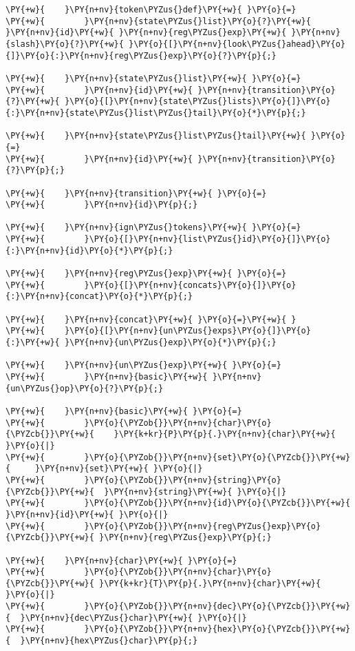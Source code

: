 \begin{Verbatim}[commandchars=\\\{\}]
\PY{+w}{    }\PY{n+nv}{token\PYZus{}def}\PY{+w}{ }\PY{o}{=}
\PY{+w}{        }\PY{n+nv}{state\PYZus{}list}\PY{o}{?}\PY{+w}{ }\PY{n+nv}{id}\PY{+w}{ }\PY{n+nv}{reg\PYZus{}exp}\PY{+w}{ }\PY{n+nv}{slash}\PY{o}{?}\PY{+w}{ }\PY{o}{[}\PY{n+nv}{look\PYZus{}ahead}\PY{o}{]}\PY{o}{:}\PY{n+nv}{reg\PYZus{}exp}\PY{o}{?}\PY{p}{;}

\PY{+w}{    }\PY{n+nv}{state\PYZus{}list}\PY{+w}{ }\PY{o}{=}
\PY{+w}{        }\PY{n+nv}{id}\PY{+w}{ }\PY{n+nv}{transition}\PY{o}{?}\PY{+w}{ }\PY{o}{[}\PY{n+nv}{state\PYZus{}lists}\PY{o}{]}\PY{o}{:}\PY{n+nv}{state\PYZus{}list\PYZus{}tail}\PY{o}{*}\PY{p}{;}

\PY{+w}{    }\PY{n+nv}{state\PYZus{}list\PYZus{}tail}\PY{+w}{ }\PY{o}{=}
\PY{+w}{        }\PY{n+nv}{id}\PY{+w}{ }\PY{n+nv}{transition}\PY{o}{?}\PY{p}{;}

\PY{+w}{    }\PY{n+nv}{transition}\PY{+w}{ }\PY{o}{=}
\PY{+w}{        }\PY{n+nv}{id}\PY{p}{;}

\PY{+w}{    }\PY{n+nv}{ign\PYZus{}tokens}\PY{+w}{ }\PY{o}{=}
\PY{+w}{        }\PY{o}{[}\PY{n+nv}{list\PYZus{}id}\PY{o}{]}\PY{o}{:}\PY{n+nv}{id}\PY{o}{*}\PY{p}{;}

\PY{+w}{    }\PY{n+nv}{reg\PYZus{}exp}\PY{+w}{ }\PY{o}{=}
\PY{+w}{        }\PY{o}{[}\PY{n+nv}{concats}\PY{o}{]}\PY{o}{:}\PY{n+nv}{concat}\PY{o}{*}\PY{p}{;}

\PY{+w}{    }\PY{n+nv}{concat}\PY{+w}{ }\PY{o}{=}\PY{+w}{ }
\PY{+w}{	}\PY{o}{[}\PY{n+nv}{un\PYZus{}exps}\PY{o}{]}\PY{o}{:}\PY{+w}{ }\PY{n+nv}{un\PYZus{}exp}\PY{o}{*}\PY{p}{;}

\PY{+w}{    }\PY{n+nv}{un\PYZus{}exp}\PY{+w}{ }\PY{o}{=}
\PY{+w}{        }\PY{n+nv}{basic}\PY{+w}{ }\PY{n+nv}{un\PYZus{}op}\PY{o}{?}\PY{p}{;}

\PY{+w}{    }\PY{n+nv}{basic}\PY{+w}{ }\PY{o}{=}
\PY{+w}{        }\PY{o}{\PYZob{}}\PY{n+nv}{char}\PY{o}{\PYZcb{}}\PY{+w}{    }\PY{k+kr}{P}\PY{p}{.}\PY{n+nv}{char}\PY{+w}{ }\PY{o}{|}
\PY{+w}{        }\PY{o}{\PYZob{}}\PY{n+nv}{set}\PY{o}{\PYZcb{}}\PY{+w}{     }\PY{n+nv}{set}\PY{+w}{ }\PY{o}{|}
\PY{+w}{        }\PY{o}{\PYZob{}}\PY{n+nv}{string}\PY{o}{\PYZcb{}}\PY{+w}{  }\PY{n+nv}{string}\PY{+w}{ }\PY{o}{|}
\PY{+w}{        }\PY{o}{\PYZob{}}\PY{n+nv}{id}\PY{o}{\PYZcb{}}\PY{+w}{      }\PY{n+nv}{id}\PY{+w}{ }\PY{o}{|}
\PY{+w}{        }\PY{o}{\PYZob{}}\PY{n+nv}{reg\PYZus{}exp}\PY{o}{\PYZcb{}}\PY{+w}{ }\PY{n+nv}{reg\PYZus{}exp}\PY{p}{;}

\PY{+w}{    }\PY{n+nv}{char}\PY{+w}{ }\PY{o}{=}
\PY{+w}{        }\PY{o}{\PYZob{}}\PY{n+nv}{char}\PY{o}{\PYZcb{}}\PY{+w}{ }\PY{k+kr}{T}\PY{p}{.}\PY{n+nv}{char}\PY{+w}{ }\PY{o}{|}
\PY{+w}{        }\PY{o}{\PYZob{}}\PY{n+nv}{dec}\PY{o}{\PYZcb{}}\PY{+w}{  }\PY{n+nv}{dec\PYZus{}char}\PY{+w}{ }\PY{o}{|}
\PY{+w}{        }\PY{o}{\PYZob{}}\PY{n+nv}{hex}\PY{o}{\PYZcb{}}\PY{+w}{  }\PY{n+nv}{hex\PYZus{}char}\PY{p}{;}


\end{Verbatim}
